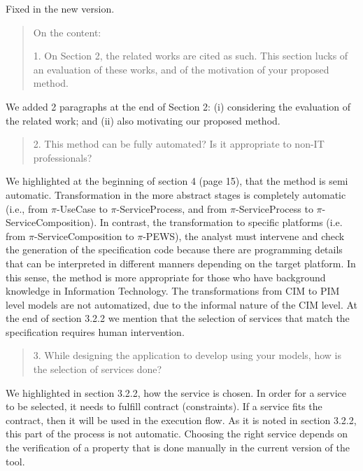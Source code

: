 \documentclass[12pt,a4wide]{article}
\begin{document}
\noindent 
Fixed in the new version.


\begin{quotation}\sf\footnotesize

\noindent On the content: 

1.    On Section 2, the related works are cited as such. This section lucks of an evaluation of these works, and of the motivation of your proposed method. 
\end{quotation}

\noindent 
We added 2 paragraphs at the end of Section 2: (i) considering the evaluation of the related work; and (ii) also motivating our proposed method. 
\begin{quotation}\sf\footnotesize

2.    This method can be fully automated? Is it appropriate to non-IT professionals? 
\end{quotation}

\noindent 
We highlighted at the beginning of section 4 (page 15), that the method is semi automatic. Transformation in the more abstract stages is completely automatic  (i.e., from $\pi$-UseCase to $\pi$-ServiceProcess, and from $\pi$-ServiceProcess to $\pi$-ServiceComposition). In contrast, the transformation to specific platforms (i.e. from $\pi$-ServiceComposition to $\pi$-PEWS), the analyst must intervene and check the generation of the specification code because there are programming details that can be interpreted in different manners depending on the target platform. In this sense, the method is more appropriate for those who have background knowledge in Information Technology.
The transformations from CIM to PIM level models are not automatized, due to the informal nature of the CIM level.
At the end of section 3.2.2 we mention that the selection of services that match the specification requires human intervention.


\begin{quotation}\sf\footnotesize

3.    While designing the application to develop using your models, how is the selection of services done? 
\end{quotation}

\noindent 
We highlighted in section 3.2.2, how the service is chosen. In order for a service to be selected, it needs to fulfill contract (constraints). If a service fits the contract, then it will be used in the execution flow.
As it is noted in section 3.2.2, this part of the process is not automatic. 
Choosing the right service depends on the verification of a property that is done manually in the current version of the tool.
\end{document}
